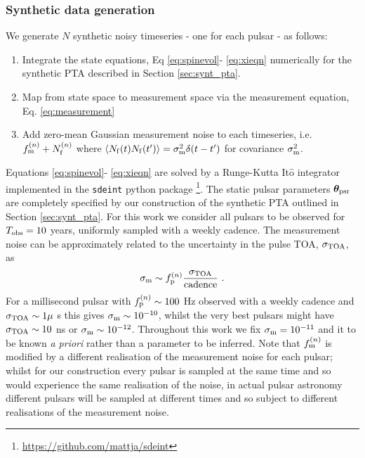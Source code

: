 \documentclass[fleqn,usenatbib,useAMS]{mnras}
\begin{document}
\subsubsection{Synthetic data generation}
We generate $N$ synthetic noisy timeseries - one for each pulsar - as follows:

\begin{enumerate}
	\item Integrate the state equations, Eq \ref{eq:spinevol}- \ref{eq:xieqn} numerically for the synthetic PTA described in Section \ref{sec:synt_pta}.
	\item Map from state space to measurement space via the measurement equation, Eq. \ref{eq:measurement}
	\item Add zero-mean Gaussian measurement noise to each timeseries, i.e. $f_{\rm m} ^{(n)} + N_{\rm f}^{(n)}$ where 	$\langle N_{\rm f}(t) N_{\rm f}(t') \rangle = \sigma_{\rm m}^2 \delta(t - t')$ for covariance $\sigma_{\rm m}^2$.
\end{enumerate}
Equations \ref{eq:spinevol}- \ref{eq:xieqn} are solved by a Runge-Kutta It$\hat{\text{o}}$ integrator implemented in the \texttt{sdeint} python package \footnote{\url{https://github.com/mattja/sdeint}}. The static pulsar parameters  $\boldsymbol{\theta}_{\rm psr}$ are completely specified by our construction of the synthetic PTA outlined in Section \ref{sec:synt_pta}. For this work we consider all pulsars to be observed for $T_{\rm obs} =10$ years, uniformly sampled with a weekly cadence. The measurement noise can be approximately related to the uncertainty in the pulse TOA, $\sigma_{\rm TOA}$, as
\begin{equation}
	\sigma_{\rm m} \sim f_{\rm p}^{(n)} \frac{\sigma_{\rm TOA}}{\text{cadence}} \ . 
\end{equation}
For a millisecond pulsar with $f_{\rm p}^{(n)} \sim 100$ Hz observed with a weekly cadence and $\sigma_{\rm TOA} \sim 1 \mu$ s this gives $\sigma_{\rm m} \sim 10^{-10}$, whilst the very best pulsars might have $\sigma_{\rm TOA} \sim 10 $ ns or $\sigma_{\rm m} \sim 10^{-12}$. Throughout this work we fix $\sigma_{\rm m} = 10^{-11}$ and it to be known \textit{a priori} rather than a parameter to be inferred. Note that $f_{\rm m} ^{(n)}$ is modified by a different realisation of the measurement noise for each pulsar; whilst for our construction every pulsar is sampled at the same time and so would experience the same realisation of the noise, in actual pulsar astronomy different pulsars will be sampled at different times and so subject to different realisations of the measurement noise. \newline 
\end{document}
